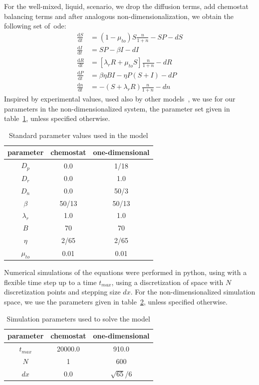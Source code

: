 For the well-mixed, liquid, scenario, we drop the diffusion terms, add chemostat balancing terms and after analogous non-dimensionalization, we obtain the following set of~\gls{ode}:
\begin{align}
    \frac{\text{d}S}{\text{d}t} &= \left( 1 - \mu_{to} \right) S \frac{n}{1+n}  - SP - d S\\
    \frac{\text{d}I}{\text{d}t} &= SP - \beta I - d I\\
    \frac{\text{d}R}{\text{d}t} &= \left[\lambda_r R + \mu_{to} S \right] \frac{n}{1+n} - d R\\
    \frac{\text{d}P}{\text{d}t} &= \beta \eta BI - \eta P(S+I) -d P\\
    \frac{\text{d}n}{\text{d}t} &= - \left( S + \lambda_r R \right) \frac{n}{1+n} - d n
\end{align}
Inspired by experimental values, used also by other models~\cite{Marchi2025-yu, Claydon2021-cu}, we use for our parameters in the non-dimensionalized system, the parameter set given in table~\ref{tab:model_parameters}, unless specified otherwise.
\begin{table}
    \centering
    \begin{tabular}{c|c|c}
         parameter & chemostat & one-dimensional \\ \hline
         $D_p$& 0.0 & 1/18\\ 
         $D_r$& 0.0 & 1.0\\ 
         $D_n$& 0.0 & 50/3\\ 
         $\beta$& 50/13 & 50/13\\ 
         $\lambda_r$& 1.0 & 1.0\\ 
         $B$& 70 & 70\\ 
         $\eta$& 2/65 & 2/65\\ 
         $\mu_{to}$& 0.01 & 0.01
    \end{tabular}
    \caption{Standard parameter values used in the model}
    \label{tab:model_parameters}
\end{table}

Numerical simulations of the equations were performed in python, using  with a flexible time step up to a time $t_{max}$, using a discretization of space with $N$ discretization points and stepping size $dx$. For the non-dimensionalized simulation space, we use the parameters given in table~\ref{tab:spacetime_parameters}, unless specified otherwise.

\begin{table}
    \centering
    \begin{tabular}{c|c|c}
         parameter & chemostat & one-dimensional \\ \hline
         $t_{max}$& 20000.0 & 910.0\\ 
         $N$& 1 & 600\\ 
         $dx$& 0.0 & $\sqrt{65}$/6
    \end{tabular}
    \caption{Simulation parameters used to solve the model}
    \label{tab:spacetime_parameters}
\end{table}

